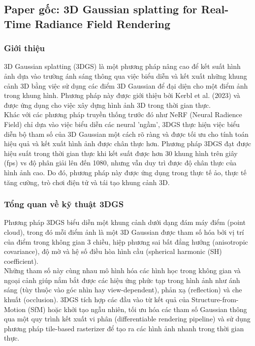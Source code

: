     \subsection{Paper gốc: 3D Gaussian splatting for Real-Time Radiance Field Rendering \cite{b1}}
        \subsubsection{Giới thiệu} 3D Gaussian splatting (3DGS) là một phương pháp nâng cao để kết suất hình ảnh  dựa vào trường ánh sáng thông qua việc biểu diễn và kết xuất những khung cảnh 3D bằng việc sử dụng các điểm 3D Gaussian để đại diện cho một điểm ảnh trong khung hình. Phương pháp này được giới thiệu bởi Kerbl et al. (2023) và được ứng dụng  cho việc xây dựng hình ảnh 3D trong thời gian thực. \\
        
        Khác với các phương pháp truyền thống trước đó như NeRF (Neural Radience Field) chỉ dựa vào việc biểu diễn các neural 'ngầm', 3DGS thực hiện việc biểu diễn bộ tham số của 3D Gaussian một cách rõ ràng và được tối ưu cho tính toán hiệu quả và kết xuất hình ảnh được chân thực hơn. Phương pháp 3DGS đạt được hiệu suất trong thời gian thực khi kết suất được hơn 30 khung hình trên giây (fps) vs độ phân giải lên đến 1080, nhưng vẫn duy trì được độ chân thực của hình ảnh cao. Do đó, phương pháp này được ứng dụng trong thực tế ảo, thực tế tăng cường, trò chơi điện tử và tái tạo khung cảnh 3D. 
        
        \subsubsection{Tổng quan về kỹ thuật 3DGS} 
        Phương pháp 3DGS biểu diễn một khung cảnh dưới dạng đám máy điểm (point cloud), trong đó mỗi điểm ảnh là một 3D Gaussian được tham số hóa bởi vị trí của điểm trong không gian 3 chiều, hiệp phương sai bất đẳng hướng (anisotropic covariance), độ mờ và hệ số điều hòa hình cầu (spherical harmonic (SH) coefficient).\\
        
        Những tham số này cùng nhau mô hình hóa các hình học trong không gian và ngoại cảnh giúp nắm bắt được các hiệu ứng phức tạp trong hình ảnh như ánh sáng (tùy thuộc vào góc nhìn hay view-dependent), phản xạ (reflection) và che khuất (occlusion). 3DGS tích hợp các đầu vào từ kết quả của Structure-from-Motion (SfM) hoặc khởi tạo ngẫu nhiên, tối ưu hóa các tham số Gaussian thông qua một quy trình kết xuất vi phân (differentiable rendering pipeline) và sử dụng phương pháp tile-based rasterizer để tạo ra các hình ảnh nhanh trong thời gian thực. 
        
